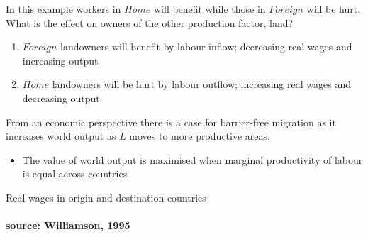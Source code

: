 \documentclass{beamer}
\begin{document}
\begin{frame}
  In this example workers in $Home$ will benefit while those in $Foreign$ will be hurt.
  What is the effect on owners of the other production factor, land?
  \begin{enumerate}
    \item $Foreign$ landowners will benefit by labour inflow; decreasing real wages and increasing output
    \item $Home$ landowners will be hurt by labour outflow; increasing real wages and decreasing output
  \end{enumerate}
  \medskip
  From an economic perspective there is a case for barrier-free migration as it increases world output as $L$ moves to more productive areas.
  \begin{itemize}
    \item The value of world output is maximised when marginal productivity of labour is equal across countries     
  \end{itemize}
\end{frame}

\begin{frame}{Real wages in origin and destination countries}
\framesubtitle{source: Williamson, 1995}
\begin{table}
\end{table}  
\end{frame}
\end{document}
